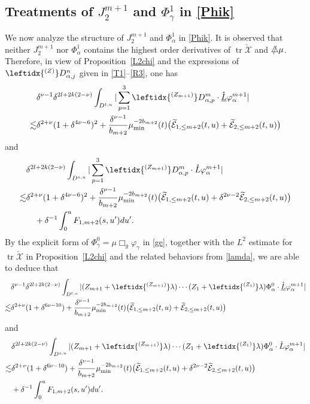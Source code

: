 \documentclass[11pt,twoside]{article}
\def\al{\alpha}
\def \no{\nonumber}
\def\f{\frac}
\def\tr{\operatorname{tr}}
\newcommand{\checkX}{\check{\mathscr{X}}} %
\begin{document}
\subsection{Treatments of $J_2^{m+1}$ and $\Phi_\gamma^1$ in \eqref{Phik}}\label{l}
We now analyze the structure of $J_2^{m+1}$ and $\Phi_\al^1$ in \eqref{Phik}.
It is observed that neither $J_2^{m+1}$ nor $\Phi_\al^1$ contains the highest  order derivatives of $\tr\check{\mathscr X}$ and $\slashed{\triangle}\mu$.
Therefore, in view of Proposition~\ref{L2chi} and the expressions of $\leftidx{^{(Z)}}D_{\al, j}^n$ given in \eqref{T1}--\eqref{R3},
one has
\begin{align}\label{ZL}
&\delta^{\nu-1}\delta^{2l+2k(2-\nu)}\int_{D^{t,u}}|\sum_{p=1}^3\leftidx{^{(Z_{m+1})}}D_{\al,p}^m\cdot \mathring{\underline L}{\varphi}_\al^{m+1}|\no\\
\lesssim&\delta^{2+\nu}(1+\delta^{4\nu-6})^2+\f{\delta^{\nu-1}}{b_{m+2}}\mu_{\min}^{-2b_{m+2}}(t)\big(\widetilde{\mathcal{E}}_{1,\leq m+2}(t,u) + \widetilde{\mathcal{E}}_{2,\leq m+2}(t,u)\big)
\end{align}
and
\begin{align}\label{ZrL}
&\delta^{2l+2k(2-\nu)}\int_{D^{s,u}}|\sum_{p=1}^3\leftidx{^{(Z_{m+1})}}D_{\al,p}^m\cdot \mathring L{\varphi}_\al^{m+1}|\no\\
\lesssim&\delta^{2+\nu}(1+\delta^{4\nu-6})^2 + \frac{\delta^{\nu-1}}{b_{m+2}} \mu_{\min}^{-2b_{m+2}}(t) \big(\widetilde{\mathcal{E}}_{1,\leq m+2}(t,u) +\delta^{2\nu-2} \widetilde{\mathcal{E}}_{2,\leq m+2}(t,u) \big)\\
&\quad+\delta^{-1}\int_0^uF_{1,m+2}(s,u')du'.\notag
\end{align}
By the explicit form of $\Phi_\gamma^0 = \mu \Box_g \varphi_\gamma$ in \eqref{ge}, together with
the $L^2$ estimate for $\tr\checkX$ in Proposition~\ref{L2chi} and the related behaviors from \eqref{lamda},
we are able to deduce that
\begin{align}\label{Phi0}
&\delta^{\nu-1}\delta^{2l+2k(2-\nu)}\int_{D^{t,u}}|(Z_{m+1}+\leftidx{^{(Z_{m+1})}}\lambda)\cdots(Z_{1}
+\leftidx{^{(Z_{1})}}\lambda)\Phi_\al^0\cdot\mathring{\underline L}\varphi_\al^{m+1}|\no\\
\lesssim&\delta^{2+\nu}(1+\delta^{6\nu-10})+\f{\delta^{\nu-1}}{b_{m+2}}\mu_{\min}^{-2b_{m+2}}(t)\big(\widetilde{\mathcal{E}}_{1,\leq m+2}(t,u)+ \widetilde{\mathcal{E}}_{2,\leq m+2}(t,u)\big)
\end{align}
and
\begin{equation}\label{rPhi}
\begin{split}
&\delta^{2l+2k(2-\nu)}\int_{D^{s,u}}|(Z_{m+1}+\leftidx{^{(Z_{m+1})}}\lambda)\cdots(Z_{1}
+\leftidx{^{(Z_{1})}}\lambda)\Phi_\al^0\cdot\mathring L\varphi_\al^{m+1}|\\
\lesssim&\delta^{2+\nu}(1+\delta^{6\nu-10})+\f{\delta^{\nu-1}}{b_{m+2}}\mu_{\min}^{-2b_{m+2}}(t)\big(\widetilde{\mathcal{E}}_{1,\leq m+2}(t,u)+ \delta^{2\nu-2}\widetilde{\mathcal{E}}_{2,\leq m+2}(t,u)\big)\\
&+\delta^{-1}\int_0^u F_{1,m+2}(s,u')du'.
\end{split}
\end{equation}
\end{document}
